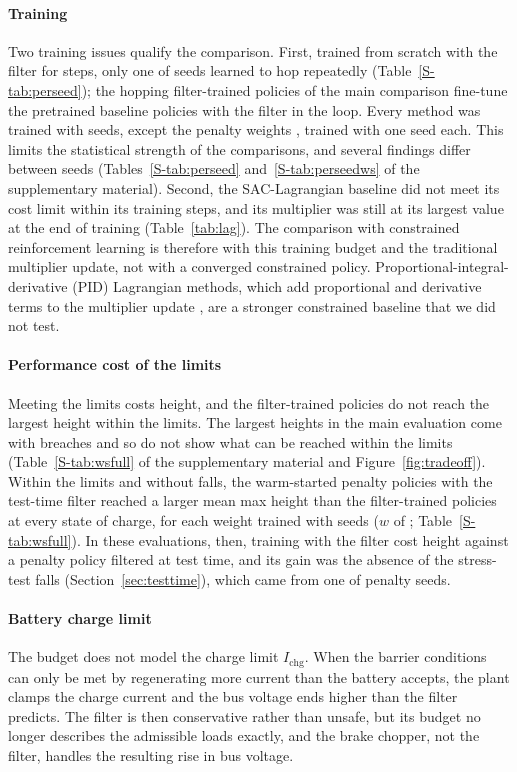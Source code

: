 \paragraph{Training}
Two training issues qualify the comparison. First, trained from scratch with the filter for  steps, only one of  seeds learned to hop repeatedly (Table~\ref{S-tab:perseed}); the hopping filter-trained policies of the main comparison fine-tune the pretrained baseline policies with the filter in the loop. Every method was trained with  seeds, except the penalty weights , trained with one seed each. This limits the statistical strength of the comparisons, and several findings differ between seeds (Tables~\ref{S-tab:perseed} and~\ref{S-tab:perseedws} of the supplementary material). Second, the SAC-Lagrangian baseline did not meet its cost limit within its  training steps, and its multiplier was still at its largest value at the end of training (Table~\ref{tab:lag}). The comparison with constrained reinforcement learning is therefore with this training budget and the traditional multiplier update, not with a converged constrained policy. Proportional-integral-derivative (PID) Lagrangian methods, which add proportional and derivative terms to the multiplier update \cite{stooke2020pid}, are a stronger constrained baseline that we did not test.

\paragraph{Performance cost of the limits}
Meeting the limits costs height, and the filter-trained policies do not reach the largest height within the limits. The largest heights in the main evaluation come with breaches and so do not show what can be reached within the limits (Table~\ref{S-tab:wsfull} of the supplementary material and Figure~\ref{fig:tradeoff}). Within the limits and without falls, the warm-started penalty policies with the test-time filter reached a larger mean max height than the filter-trained policies at every state of charge, for each weight trained with  seeds ($w$ of ; Table~\ref{S-tab:wsfull}). In these evaluations, then, training with the filter cost height against a penalty policy filtered at test time, and its gain was the absence of the stress-test falls (Section~\ref{sec:testtime}), which came from one of  penalty seeds.

\paragraph{Battery charge limit}
The budget does not model the charge limit $I_{\mathrm{chg}}$. When the barrier conditions can only be met by regenerating more current than the battery accepts, the plant clamps the charge current and the bus voltage ends higher than the filter predicts. The filter is then conservative rather than unsafe, but its budget no longer describes the admissible loads exactly, and the brake chopper, not the filter, handles the resulting rise in bus voltage.

